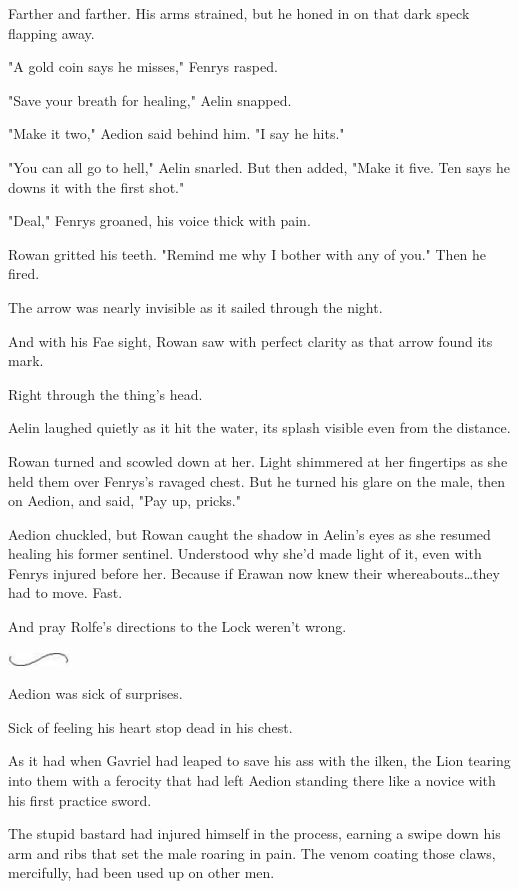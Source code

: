 Farther and farther.
His arms strained, but he honed in on that dark speck flapping away.

"A gold coin says he misses," Fenrys rasped.

"Save your breath for healing," Aelin snapped.

"Make it two," Aedion said behind him.
"I say he hits."

"You can all go to hell," Aelin snarled.
But then added, "Make it five.
Ten says he downs it with the first shot."

"Deal," Fenrys groaned, his voice thick with pain.

Rowan gritted his teeth.
"Remind me why I bother with any of you."
Then he fired.

The arrow was nearly invisible as it sailed through the night.

And with his Fae sight, Rowan saw with perfect clarity as that arrow found its mark.

Right through the thing's head.

Aelin laughed quietly as it hit the water, its splash visible even from the distance.

Rowan turned and scowled down at her.
Light shimmered at her fingertips as she held them over Fenrys's ravaged chest.
But he turned his glare on the male, then on Aedion, and said, "Pay up, pricks."

Aedion chuckled, but Rowan caught the shadow in Aelin's eyes as she resumed healing his former sentinel.
Understood why she'd made light of it, even with Fenrys injured before her.
Because if Erawan now knew their whereabouts\ldots they had to move.
Fast.

And pray Rolfe's directions to the Lock weren't wrong.

\begin{center}
	\includegraphics[width=0.65in,height=0.13in]{images/seperator}
\end{center}

Aedion was sick of surprises.

Sick of feeling his heart stop dead in his chest.

As it had when Gavriel had leaped to save his ass with the ilken, the Lion tearing into them with a ferocity that had left Aedion standing there like a novice with his first practice sword.

The stupid bastard had injured himself in the process, earning a swipe down his arm and ribs that set the male roaring in pain.
The venom coating those claws, mercifully, had been used up on other men.


